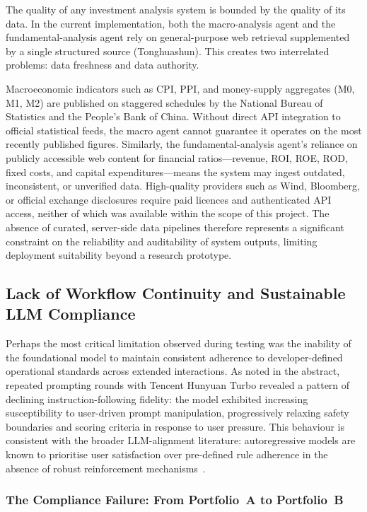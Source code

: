 \documentclass[11pt,a4paper]{article}
\begin{document}
The quality of any investment analysis system is bounded by the quality
of its data. In the current implementation, both the macro-analysis
agent and the fundamental-analysis agent rely on general-purpose web
retrieval supplemented by a single structured source (Tonghuashun).
This creates two interrelated problems: data freshness and data
authority.

Macroeconomic indicators such as CPI, PPI, and money-supply aggregates
(M0, M1, M2) are published on staggered schedules by the National Bureau
of Statistics and the People's Bank of China. Without direct API
integration to official statistical feeds, the macro agent cannot
guarantee it operates on the most recently published figures. Similarly,
the fundamental-analysis agent's reliance on publicly accessible web
content for financial ratios---revenue, ROI, ROE, ROD, fixed costs, and
capital expenditures---means the system may ingest outdated, inconsistent,
or unverified data. High-quality providers such as Wind, Bloomberg, or
official exchange disclosures require paid licences and authenticated
API access, neither of which was available within the scope of this
project. The absence of curated, server-side data pipelines therefore
represents a significant constraint on the reliability and auditability
of system outputs, limiting deployment suitability beyond a research
prototype.

\subsection{Lack of Workflow Continuity and Sustainable LLM Compliance}
\label{subsec:continuity}

Perhaps the most critical limitation observed during testing was the
inability of the foundational model to maintain consistent adherence to
developer-defined operational standards across extended interactions. As
noted in the abstract, repeated prompting rounds with Tencent Hunyuan
Turbo revealed a pattern of declining instruction-following fidelity:
the model exhibited increasing susceptibility to user-driven prompt
manipulation, progressively relaxing safety boundaries and scoring
criteria in response to user pressure. This behaviour is consistent with
the broader LLM-alignment literature: autoregressive models are known to
prioritise user satisfaction over pre-defined rule adherence in the
absence of robust reinforcement mechanisms~\cite{sharma2024sycophancy,malmqvist2024sycophancy}.

\subsubsection*{The Compliance Failure: From Portfolio~A to Portfolio~B}
\end{document}
